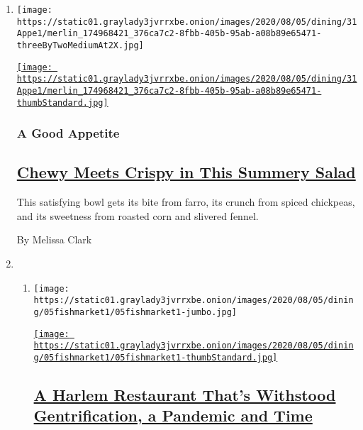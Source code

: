 \begin{enumerate}
\def\labelenumi{\arabic{enumi}.}
\item
  \texttt{[image: https://static01.graylady3jvrrxbe.onion/images/2020/08/05/dining/31Appe1/merlin\_174968421\_376ca7c2-8fbb-405b-95ab-a08b89e65471-threeByTwoMediumAt2X.jpg]}

  \href{/2020/07/31/dining/farro-corn-chickpea-salad-recipe.html}{\texttt{[image: https://static01.graylady3jvrrxbe.onion/images/2020/08/05/dining/31Appe1/merlin\_174968421\_376ca7c2-8fbb-405b-95ab-a08b89e65471-thumbStandard.jpg]}}

  \hypertarget{a-good-appetite}{%
  \subsubsection{A Good Appetite}\label{a-good-appetite}}

  \hypertarget{chewy-meets-crispy-in-this-summery-salad}{%
  \subsection{\texorpdfstring{\href{/2020/07/31/dining/farro-corn-chickpea-salad-recipe.html}{Chewy
  Meets Crispy in This Summery
  Salad}}{Chewy Meets Crispy in This Summery Salad}}\label{chewy-meets-crispy-in-this-summery-salad}}

  This satisfying bowl gets its bite from farro, its crunch from spiced
  chickpeas, and its sweetness from roasted corn and slivered fennel.

  By Melissa Clark
\item
  \begin{enumerate}
  \def\labelenumii{\arabic{enumii}.}
  \item
    \texttt{[image: https://static01.graylady3jvrrxbe.onion/images/2020/08/05/dining/05fishmarket1/05fishmarket1-jumbo.jpg]}

    \href{/2020/07/30/dining/famous-fish-market-harlem.html}{\texttt{[image: https://static01.graylady3jvrrxbe.onion/images/2020/08/05/dining/05fishmarket1/05fishmarket1-thumbStandard.jpg]}}

    \hypertarget{a-harlem-restaurant-thats-withstood-gentrification-a-pandemic-and-time}{%
    \subsection{\texorpdfstring{\href{/2020/07/30/dining/famous-fish-market-harlem.html}{A
    Harlem Restaurant That's Withstood Gentrification, a Pandemic and
    Time}}{A Harlem Restaurant That's Withstood Gentrification, a Pandemic and Time}}\label{a-harlem-restaurant-thats-withstood-gentrification-a-pandemic-and-time}}


\end{enumerate}
\end{enumerate}
